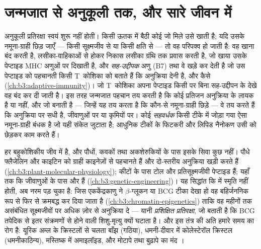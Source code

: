 \section{जन्मजात से अनुकूली तक, और सारे जीवन में}

\begin{proposition}[वृक्षाभ कोशिका का निर्णय]\label{prop:b3:innate-immunity:bridge}
अनुकूली प्रतिरक्षा स्वयं शुरू नहीं होती। किसी ऊतक में बैठी कोई
\emph{} जो मिले उसे खाती है; यदि उसके नमूना-ग्राही छिड़
जाएँ --- किसी सूक्ष्मजीव से या किसी क्षति से --- तो वह परिपक्व हो जाती
है: वह खाना बंद करती है, लसीका-वाहिकाओं से होकर निकास लसीका ग्रंथि तक
प्रवास करती है, जो खाया उसके पेप्टाइड MHC अणुओं पर दिखाती है, और
\emph{सह-उद्दीपक} अणु (B7) तथा वे  खड़े कर देती है जो उस
पेप्टाइड को पहचानती किसी T~कोशिका को बताते हैं कि अनुक्रिया देनी है,
और कैसे (\cref{ch:b3:adaptive-immunity})। जो T~कोशिका अपना पेप्टाइड
किसी  पर बिना सह-उद्दीपन के देखे वह बंद कर दी जाती है।
इस तरह जन्मजात पहचान तय करती है कि कोई प्रतिजन अनुक्रिया के लायक है या
नहीं, और  जो  बनाती है --- जिन्हें यह तय करता
है कि कौन-से नमूना-ग्राही छिड़े --- वे तय करते हैं कि अनुक्रिया
 पर सधी है, जीवाणुओं पर या कृमियों पर। कोई \emph{सहवर्धक} किसी
टीके में जोड़ा गया ऐसा नमूना-ग्राही बंधक है जो यही संकेत जुटाता है;
आधुनिक टीकों के फिटकरी और लिपिड नैनोकण उसी को छेड़कर काम करते हैं।
\end{proposition}

\begin{remark}\label{rem:b3:innate-immunity:everywhere}
हर बहुकोशिकीय जीव में  है, और पौधों, कवकों तथा
अकशेरुकियों के पास इसके सिवा कुछ नहीं। पौधे फ्लैजेलिन और काइटिन को
ग्राही काइनेज़ों से पहचानते हैं और दो-स्तरीय अनुक्रिया खड़ी करते हैं
(\cref{ch:b3:plant-molecular-physiology}); कीटों के पास टोल और
प्रतिसूक्ष्मजीवी पेप्टाइड हैं; यहाँ तक कि जीवाणुओं के पास  और  हैं (\cref{ch:b3:genetic-engineering})। यह सिद्धांत
कि  में स्मृति नहीं होती, अब नरम पड़ चुका है: जिस
एककेंद्रकाणु ने $\beta$-ग्लूकन या BCG टीका देखा हो वह
बहिर्जननिक रूप से फिर से क्रमबद्ध कर दिया जाता है
(\cref{ch:b3:chromatin-epigenetics}) ताकि वह महीनों तक असंबंधित
सूक्ष्मजीवों पर अधिक ज़ोर से अनुक्रिया दे --- यानी \emph{प्रशिक्षित
प्रतिरक्षा}, जो बताती है कि BCG तपेदिक से इतर संक्रमणों से होने वाली
शिशु-मृत्यु क्यों घटाता है। और इस तंत्र की अति हमारे समय का रोग है:
यूरिक अम्ल के क्रिस्टलों से चलता बाँझ  (गठिया), धमनी-दीवार में
कोलेस्टेरॉल क्रिस्टल (धमनीकाठिन्य), मस्तिष्क में अमाइलॉइड, और मोटापे
तथा बुढ़ापे का मंद ।
\end{remark}


